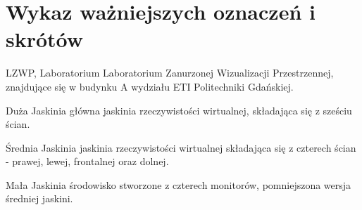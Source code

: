 \chapter*{Wykaz ważniejszych oznaczeń i skrótów}
\begin{labeling}[align=right,labelwidth=5cm]
    \item [LZWP, Laboratorium] Laboratorium Zanurzonej Wizualizacji Przestrzennej, znajdujące się w budynku A wydziału ETI Politechniki Gdańskiej.
    \item [Duża Jaskinia] główna jaskinia rzeczywistości wirtualnej, składająca się z sześciu ścian.
    \item [Średnia Jaskinia] jaskinia rzeczywistości wirtualnej składająca się z czterech ścian - prawej, lewej, frontalnej oraz dolnej.
    \item [Mała Jaskinia] środowisko stworzone z czterech monitorów, pomniejszona wersja średniej jaskini.
\end{labeling}